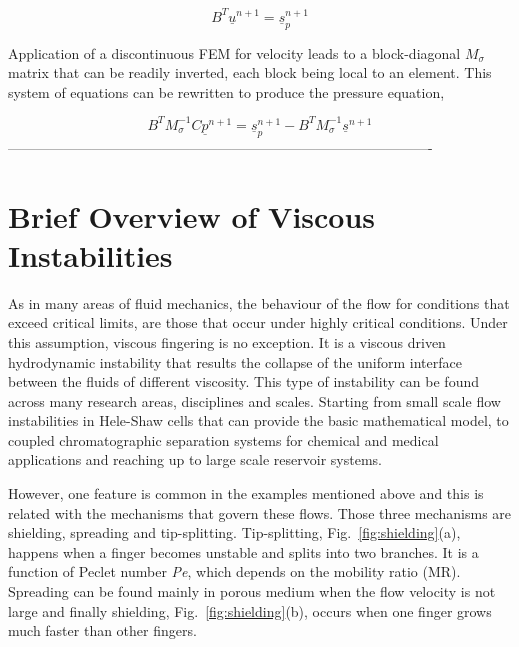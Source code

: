 \documentclass[preprint,authoryear,12pt]{elsarticle}
\begin{document}
\begin{equation}
B^T {{\underline{u}}^{n+1}} = {\underline{s}_p ^{n+1}}
\label{force balance eq}
\end{equation}

\noindent Application of a discontinuous FEM for velocity leads to a block-diagonal $M_{\sigma}$ matrix that can be readily inverted, each block being local to an element. This system of equations can be rewritten to produce the pressure equation, 

\begin{equation}
B^T M_{\sigma} ^{-1} C{{\underline{p}}^{n+1}} = {\underline{s}_p ^{n+1}} - B^T M_{\sigma} ^{-1} {{\underline{s}}^{n+1}} 
\label{pressure eq}
\end{equation}
-------------------------------------------------------------------------------------------
   

\section{Brief Overview of Viscous Instabilities}\label{section:ViscousInstabilities}
As in many areas of fluid mechanics, the behaviour of the flow for conditions that exceed critical limits, are those that occur under highly critical conditions. Under this assumption, viscous fingering is no exception. It is a viscous driven hydrodynamic instability that results the collapse of the uniform interface between the fluids of different viscosity. This type of instability can be found across many research areas, disciplines and scales. Starting from small scale flow instabilities in Hele-Shaw cells that can provide the basic mathematical model, to coupled chromatographic separation systems for chemical and medical applications and reaching up to large scale reservoir systems.

However, one feature is common in the examples mentioned above and this is related with the mechanisms that govern these flows. Those three mechanisms are shielding, spreading and tip-splitting. Tip-splitting, Fig.~\ref{fig:shielding}(a), happens when a finger becomes unstable and splits into two branches. It is a function of Peclet number \textit{Pe}, which depends on the mobility ratio (MR). Spreading can be found mainly in porous medium when the flow velocity is not large and finally shielding, Fig.~\ref{fig:shielding}(b), occurs when one finger grows much faster than other fingers.
\end{document}
